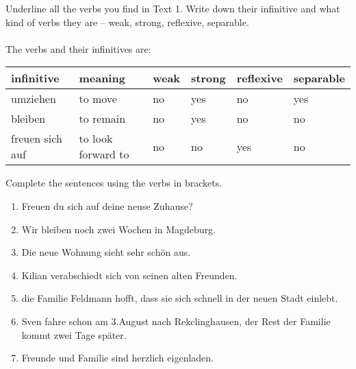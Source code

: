 \begin{exercise}
  Underline all the verbs you find in Text 1. Write down their infinitive
  and what kind of verbs they are -- weak, strong, reflexive, separable.
  \\\\
  The verbs and their infinitives are:
  \begin{center}
  \begin{tabular}{|l|l|l|l|l|l|}
    \hline
    infinitive&meaning&weak&strong&reflexive&separable\\
    \hline
    umziehen&to move&no&yes&no&yes\\
    bleiben&to remain&no&yes&no&no\\
    freuen sich auf&to look forward to&no&no&yes&no\\
    \hline
  \end{tabular}
\end{center}
\end{exercise}

\begin{exercise}
  Complete the sentences using the verbs in brackets.
  \begin{enumerate}[label=\arabic*.]
  \item Freuen du sich auf deine neuse Zuhause?
  \item Wir bleiben noch zwei Wochen in Magdeburg.
  \item Die neue Wohnung sieht sehr schön aus.
  \item Kilian verabschiedt sich von seinen alten Freunden.
  \item die Familie Feldmann hofft, dass sie sich schnell in der neuen
    Stadt einlebt.
  \item Sven fahre schon am 3.\@ August nach Rekclinghausen, der Rest der
    Familie kommt zwei Tage später.
  \item Freunde und Familie sind herzlich eigenladen.
  \end{enumerate}
\end{exercise}




